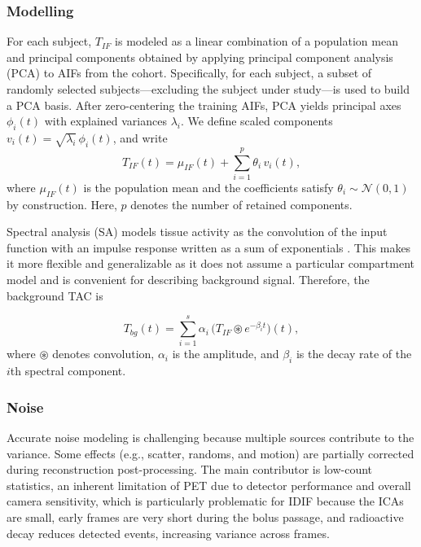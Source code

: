 \subsubsection{Modelling}\label{sec:bgtm_modelling} %
For each subject, \(T_{IF}\) is modeled as a linear combination of a population mean and principal components obtained by applying principal component analysis (PCA) to AIFs from the cohort.
Specifically, for each subject, a subset of randomly selected subjects—excluding the subject under study—is used to build a PCA basis. %
After zero-centering the training AIFs, PCA yields principal axes \(\phi_i(t)\) with explained variances \(\lambda_i\).
We define scaled components \(v_i(t) = \sqrt{\lambda_i}\,\phi_i(t)\), and write
\begin{equation}
	T_{IF}(t) = \mu_{IF}(t) + \sum_{i=1}^p \theta_i\,v_i(t),
\end{equation}
where \(\mu_{IF}(t)\) is the population mean and the coefficients satisfy \(\theta_i \sim \mathcal{N}(0,1)\) by construction.
Here, \(p\) denotes the number of retained components.

Spectral analysis (SA) models tissue activity as the convolution of the input function with an impulse response written as a sum of exponentials \cite{cunningham1993spectral}.
This makes it more flexible and generalizable as it does not assume a particular compartment model and is convenient for describing background signal.
Therefore, the background TAC is

\begin{equation}
	T_{bg}(t) = \sum_{i=1}^s \alpha_{i} \,\bigl(T_{IF} \circledast e^{-\beta_{i} t}\bigr)(t),
\end{equation}
where \(\circledast\) denotes convolution, \(\alpha_i\) is the amplitude, and \(\beta_i\) is the decay rate of the \(i\)th spectral component.

\subsubsection{Noise}
Accurate noise modeling is challenging because multiple sources contribute to the variance.
Some effects (e.g., scatter, randoms, and motion) are partially corrected during reconstruction post-processing. %
The main contributor is low-count statistics, an inherent limitation of PET due to detector performance and overall camera sensitivity, which is particularly problematic for IDIF because the ICAs are small, early frames are very short during the bolus passage, and radioactive decay reduces detected events, increasing variance across frames.

